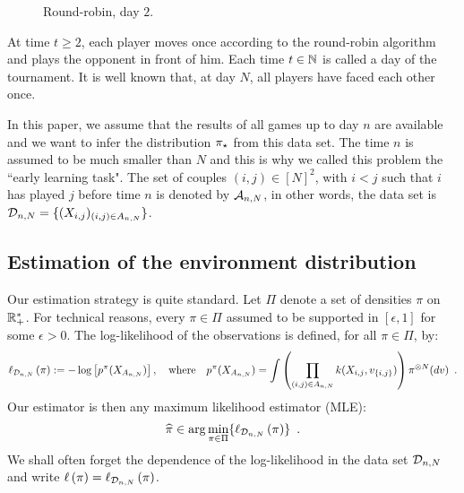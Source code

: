 \begin{figure}
\centering
{}
\caption{Round-robin, day $2$.}
\label{fig:robin:day2}
\end{figure}

At time $t\ge 2$, each player moves once according to the round-robin algorithm and plays the opponent in front of him. Each time $t\in\mathbb{N}$ is called a day of the tournament. It is well known that, at day $N$, all players have faced each other once. 

In this paper, we assume that the results of all games up to day $n$ are available and we want to infer the distribution $\pi_{\star}$ from this data set. The time $n$ is assumed to be much smaller than $N$ and this is why we called this problem the ``early learning task". The set of couples $(i,j)\in[N]^2$, with $i<j$ such that $i$ has played $j$ before time $n$ is denoted by $\mathcal{A}_{n,N}$, in other words, the data set is $\mathcal{D}_{n,N}=\{(X_{i,j})_{(i,j)\in A_{n,N}}\}$.


\subsection{Estimation of the environment distribution}
Our estimation strategy is quite standard. Let $\Pi$ denote a set of densities $\pi$ on $\mathbb{R}_+^*$. For technical reasons, every $\pi\in\Pi$ assumed to be supported in $[\epsilon,1]$ for some $\epsilon>0$. The log-likelihood of the observations is defined, for all $\pi\in\Pi$, by:
\[
\ell_{\mathcal{D}_{n,N}}\left(\pi\right):=-\log\left[p^{\pi}(X_{A_{n,N}})\right],\quad \text{where}\quad p^{\pi}(X_{A_{n,N}})=\int  \left(\prod_{(i,j)\in A_{n,N}}k(X_{i,j},v_{\{i,j\}})\right)\pi^{\otimes N}(dv)\enspace.
\]
Our estimator is then any maximum likelihood estimator (MLE):
\[
\widehat{\pi}\in \arg\min_{\pi\in\Pi}\{\ell_{\mathcal{D}_{n,N}}\left(\pi\right)\}\enspace.
\]
We shall often forget the dependence of the log-likelihood in the data set $\mathcal{D}_{n,N}$ and write $\ell\left(\pi\right)=\ell_{\mathcal{D}_{n,N}}\left(\pi\right)$.

